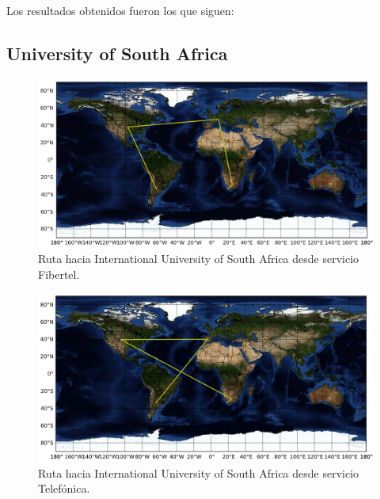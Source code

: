 \documentclass[10pt, a4paper]{article}
\begin{document}
Los resultados obtenidos fueron los que siguen:

\subsection{University of South Africa}

\begin{figure}[H] %
\begin{center}
\includegraphics[width=400pt]{../imgs/map-unisa.png}
\caption{Ruta hacia International University of South Africa desde servicio Fibertel.}
\end{center}
\end{figure}

\begin{figure}[H] %
\begin{center}
\includegraphics[width=400pt]{../imgs/map-unisa(telef).png}
\caption{Ruta hacia International University of South Africa desde servicio Telefónica.}
\end{center}
\end{figure}



\end{document}
